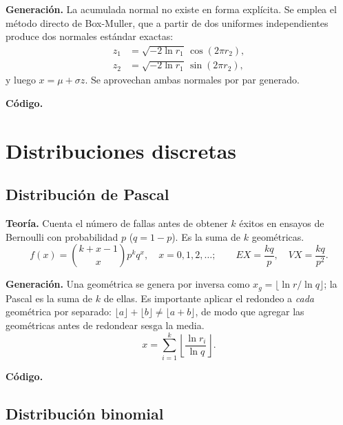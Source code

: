 \documentclass[11pt]{article}
\begin{document}
\textbf{Generaci\'on.} La acumulada normal no existe en forma expl\'icita.
Se emplea el m\'etodo directo de Box-Muller, que a partir de dos uniformes
independientes produce dos normales est\'andar exactas:
\begin{align}
z_1 &= \sqrt{-2\ln r_1}\,\cos(2\pi r_2), \\
z_2 &= \sqrt{-2\ln r_1}\,\sin(2\pi r_2),
\end{align}
y luego $x = \mu + \sigma z$. Se aprovechan ambas normales por par
generado.

\textbf{C\'odigo.}


\section{Distribuciones discretas}

\subsection{Distribuci\'on de Pascal}

\textbf{Teor\'ia.} Cuenta el n\'umero de fallas antes de obtener $k$ \'exitos
en ensayos de Bernoulli con probabilidad $p$ ($q = 1-p$). Es la suma de $k$
geom\'etricas.
\begin{equation}
f(x) = \binom{k+x-1}{x} p^k q^x, \quad x = 0,1,2,\dots;
\qquad EX = \frac{kq}{p}, \quad VX = \frac{kq}{p^2}.
\end{equation}

\textbf{Generaci\'on.} Una geom\'etrica se genera por inversa como
$x_g = \lfloor \ln r / \ln q \rfloor$; la Pascal es la suma de $k$ de ellas.
Es importante aplicar el redondeo a \emph{cada} geom\'etrica por separado:
$\lfloor a \rfloor + \lfloor b \rfloor \ne \lfloor a+b \rfloor$, de modo que
agregar las geom\'etricas antes de redondear sesga la media.
\begin{equation}
x = \sum_{i=1}^{k} \left\lfloor \frac{\ln r_i}{\ln q} \right\rfloor.
\end{equation}

\textbf{C\'odigo.}


\subsection{Distribuci\'on binomial}
\end{document}
